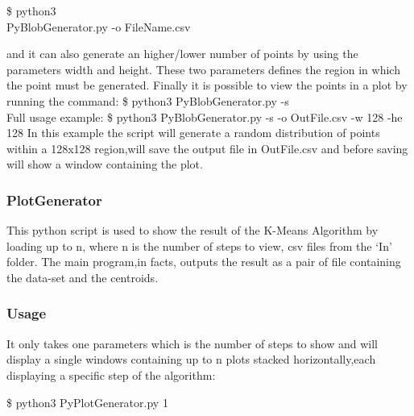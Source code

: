 \documentclass[10pt,twocolumn,letterpaper]{article}
\newenvironment{Shaded}{}{}
\newcommand{\ExtensionTok}[1]{#1}
\newcommand{\NormalTok}[1]{#1}
\begin{document}
\begin{Shaded}
\begin{Highlighting}[]
\NormalTok{\$ }\ExtensionTok{python3}\\
\NormalTok{ PyBlobGenerator.py -o FileName.csv}
\end{Highlighting}
\end{Shaded}
and it can also generate an higher/lower number of points by using the parameters width and height.\newline
These two parameters defines the region in which the point must be generated.\newline
Finally it is possible to view the points in a plot by running the command:\newline
\NormalTok{\$ }\ExtensionTok{python3}\NormalTok{ PyBlobGenerator.py -s }\\
Full usage example:\newline
\NormalTok{\$ }\ExtensionTok{python3}\NormalTok{ PyBlobGenerator.py -s -o OutFile.csv -w 128 -he 128 }\newline
In this example the script will generate a random distribution of points within a 128x128 region,will save the output file in 
OutFile.csv and before saving will show a window containing the plot.\newline
\subsubsection{PlotGenerator}
This python script is used to show the result of the K-Means Algorithm by loading up to n, where n is the number of steps to view, csv 
files from the `In' folder.\newline
The main program,in facts, outputs the result as a pair of file containing the data-set and the centroids.\newline
\subsubsection{Usage}
It only takes one parameters which is the number of steps to show and will display a single windows containing up to n plots stacked
horizontally,each displaying a specific step of the algorithm:\newline
\begin{Shaded}
\begin{Highlighting}[]
\NormalTok{\$ }\ExtensionTok{python3} \NormalTok{ PyPlotGenerator.py 1}
\end{Highlighting}
\end{Shaded}
\end{document}
